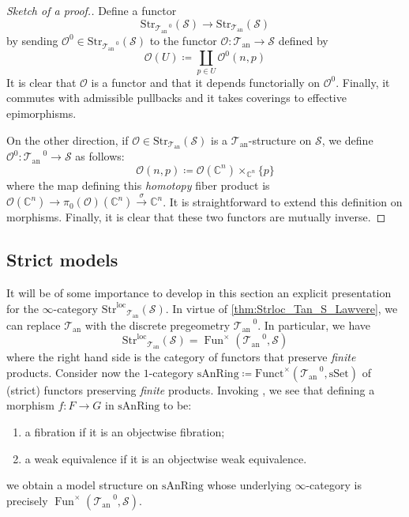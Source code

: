 \documentclass[12pt,a4paper,reqno]{amsart}
\theoremstyle{plain}
\theoremstyle{definition}
\theoremstyle{remark}
\numberwithin{equation}{section}
\begin{document}
\begin{proof}[Sketch of a proof.]
	Define a functor
	\[ {\mathrm{Str}}_{{{\mathcal T}_{\mathrm{an}}}^{\; \! 0}}({\mathcal S}) \to {\mathrm{Str}}_{{\mathcal T}_{\mathrm{an}}}({\mathcal S}) \]
	by sending ${\mathcal O}^0 \in {\mathrm{Str}}_{{{\mathcal T}_{\mathrm{an}}}^{\; \! 0}}({\mathcal S})$ to the functor ${\mathcal O} \colon {{\mathcal T}_{\mathrm{an}}} \to {\mathcal S}$ defined by
	\[ {\mathcal O}(U) \coloneqq \coprod_{p \in U} {\mathcal O}^0(n,p) \]
	It is clear that ${\mathcal O}$ is a functor and that it depends functorially on ${\mathcal O}^0$.
	Finally, it commutes with admissible pullbacks and it takes coverings to effective epimorphisms.
	
	On the other direction, if ${\mathcal O} \in {\mathrm{Str}}_{{\mathcal T}_{\mathrm{an}}}({\mathcal S})$ is a ${{\mathcal T}_{\mathrm{an}}}$-structure on ${\mathcal S}$, we define ${\mathcal O}^0 \colon {{{\mathcal T}_{\mathrm{an}}}^{\; \! 0}} \to {\mathcal S}$ as follows:
	\[ {\mathcal O}(n,p) \coloneqq {\mathcal O}(\mathbb C^n) \times_{\mathbb C^n} \{p\} \]
	where the map defining this \emph{homotopy} fiber product is ${\mathcal O}(\mathbb C^n) \to \pi_0({\mathcal O})(\mathbb C^n) \xrightarrow{\sigma} \mathbb C^n$.
	It is straightforward to extend this definition on morphisms.
	Finally, it is clear that these two functors are mutually inverse.
\end{proof}

\subsection{Strict models} \label{subsec:strict_models}

It will be of some importance to develop in this section an explicit presentation for the $\infty$-category ${\mathrm{Str}^\mathrm{loc}}_{{\mathcal T}_{\mathrm{an}}}({\mathcal S})$.
In virtue of \cref{thm:Strloc_Tan_S_Lawvere}, we can replace ${{\mathcal T}_{\mathrm{an}}}$ with the discrete pregeometry ${{{\mathcal T}_{\mathrm{an}}}^{\; \! 0}}$.
In particular, we have
\[ {\mathrm{Str}^\mathrm{loc}}_{{\mathcal T}_{\mathrm{an}}}({\mathcal S}) = \operatorname{Fun}^\times({{{\mathcal T}_{\mathrm{an}}}^{\; \! 0}}, {\mathcal S}) \]
where the right hand side is the category of functors that preserve \emph{finite} products.
Consider now the $1$-category $\mathrm{sAnRing} \coloneqq \mathrm{Funct}^\times({{{\mathcal T}_{\mathrm{an}}}^{\; \! 0}}, {\mathrm{sSet}})$ of (strict) functors preserving \emph{finite} products.
Invoking \cite[5.5.9.1, 5.5.9.2]{HTT}, we see that defining a morphism $f \colon F \to G$ in $\mathrm{sAnRing}$ to be:
\begin{enumerate}
	\item a fibration if it is an objectwise fibration;
	\item a weak equivalence if it is an objectwise weak equivalence.
\end{enumerate}
we obtain a model structure on $\mathrm{sAnRing}$ whose underlying $\infty$-category is precisely $\operatorname{Fun}^\times({{{\mathcal T}_{\mathrm{an}}}^{\; \! 0}}, {\mathcal S})$.
\end{document}
